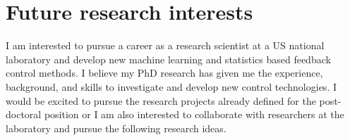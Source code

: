 \documentclass[11pt, a4paper]{article} %
\begin{document}
\section*{Future research interests}

I am interested to pursue a career as a research scientist at a US national 
laboratory and develop new machine learning and statistics based 
feedback control methods. I believe my PhD research has given me the 
experience, background, and skills to investigate and develop new control 
technologies. I would be excited to pursue the research projects already 
defined for the post-doctoral position or I am also interested to collaborate 
with researchers at the laboratory and pursue the following research ideas.

%
%
%
\end{document}
